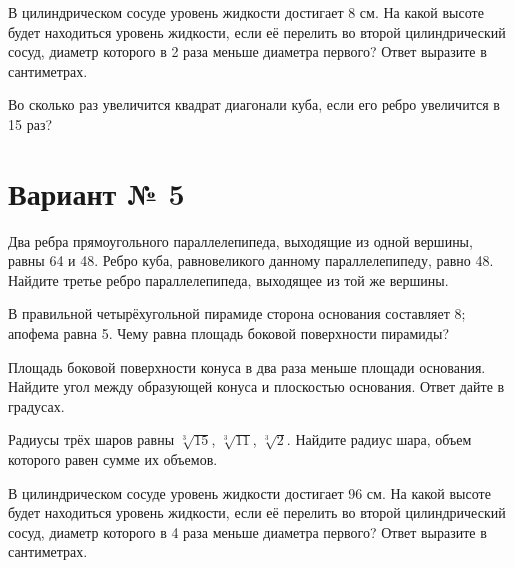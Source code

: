 \documentclass[4apaper]{article}
\begin{document}
\begin{taskBN}{5}
В цилиндрическом сосуде уровень жидкости достигает 8 см. На какой высоте будет находиться уровень жидкости, если её перелить во второй цилиндрический сосуд, диаметр которого в 2 раза меньше диаметра первого? Ответ выразите в сантиметрах.
\end{taskBN}

\begin{taskBN}{6}
Во сколько раз увеличится квадрат диагонали куба, если его ребро увеличится в 15 раз?
\end{taskBN}
\newpage\section*{Вариант № 5}

\begin{taskBN}{1}
Два ребра прямоугольного параллелепипеда, выходящие из одной вершины, равны 64 и 48. Ребро куба, равновеликого данному параллелепипеду, равно 48. Найдите третье ребро параллелепипеда, выходящее из той же вершины.
\end{taskBN}

\begin{taskBN}{2}
В правильной четырёхугольной пирамиде сторона основания составляет 8; апофема равна 5. Чему равна площадь боковой поверхности пирамиды?
\end{taskBN}

\begin{taskBN}{3}
Площадь боковой поверхности конуса в два раза меньше площади основания. Найдите угол между образующей конуса и плоскостью основания. Ответ дайте в градусах.
\end{taskBN}

\begin{taskBN}{4}
Радиусы трёх шаров равны $\sqrt[3]{15}$, $\sqrt[3]{11}$, $\sqrt[3]{2}$. Найдите радиус шара, объем которого равен сумме их объемов.
\end{taskBN}

\begin{taskBN}{5}
В цилиндрическом сосуде уровень жидкости достигает 96 см. На какой высоте будет находиться уровень жидкости, если её перелить во второй цилиндрический сосуд, диаметр которого в 4 раза меньше диаметра первого? Ответ выразите в сантиметрах.
\end{taskBN}
\end{document}
